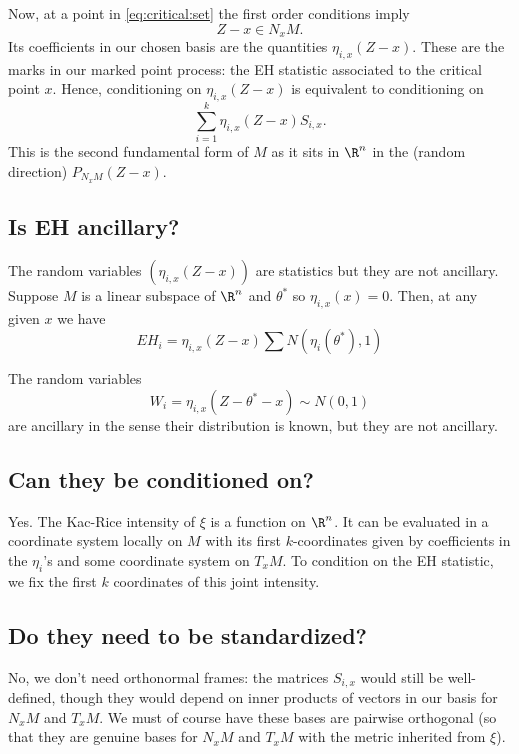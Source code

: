 \documentclass{article}
\begin{document}
Now, at a point in \eqref{eq:critical:set} the first order conditions imply
$$
Z-x \in N_xM.
$$
Its coefficients in our chosen basis are the quantities $\eta_{i,x}(Z-x)$. These are the marks
in our marked point process: the EH statistic associated to the critical point $x$. Hence, conditioning on $\eta_{i,x}(Z-x)$ is equivalent to conditioning on 
$$
\sum_{i=1}^k \eta_{i,x}(Z-x) S_{i,x}.
$$
This is the second fundamental form of $M$ as it sits in $\R^n$ in the (random direction) $P_{N_xM}(Z-x)$.

\subsection{Is EH ancillary?}

The random variables $(\eta_{i,x}(Z-x))$ are statistics but they are not ancillary.
Suppose $M$ is a linear subspace of $\R^n$ and $\theta^*$ so $\eta_{i,x}(x)=0$.
Then, at any given $x$ we have
$$
EH_i = \eta_{i,x}(Z-x) \sum N(\eta_i(\theta^*), 1)
$$

The random variables
$$
W_i = \eta_{i,x}(Z-\theta^*-x) \sim N(0, 1)
$$
are ancillary in the sense their distribution is known, but they are not ancillary.

\subsection{Can they be conditioned on?}

Yes. The Kac-Rice intensity of $\xi$ is a function on $\R^n$. It can be evaluated in
a coordinate system locally on $M$ with its first $k$-coordinates given by coefficients
in the $\eta_i$'s and some coordinate system on $T_xM$. To condition on the
EH statistic, we fix the first $k$ coordinates of this joint intensity.

\subsection{Do they need to be standardized?}

No, we don't need orthonormal frames: the matrices $S_{i,x}$ would still be well-defined, though they would depend on inner products of vectors in our basis for $N_xM$ and $T_xM$. We must of course have these bases are pairwise orthogonal (so that they are genuine bases for $N_xM$ and $T_xM$ with the metric inherited from $\xi$).
\end{document}
